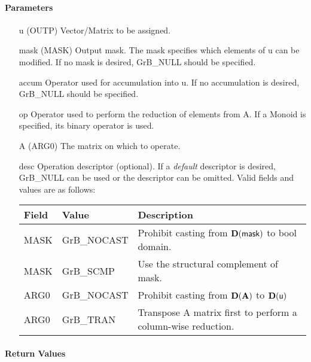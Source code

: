\paragraph{Parameters}

\begin{itemize}[leftmargin=1.1in]
    \item[{\sf u}]   ({\sf OUTP}) Vector/Matrix to be assigned.

    \item[{\sf mask}] ({\sf MASK}) Output mask. The mask specifies which elements
    of {\sf u} can be modified. If no mask is desired, {\sf GrB\_NULL} should be specified.

    \item[{\sf accum}] Operator used for accumulation into {\sf u}.  If no accumulation
                        is desired, {\sf GrB\_NULL} should be specified.

    \item[{\sf op}]    Operator used to perform the reduction of elements from {\sf A}.  If a Monoid is specified, its binary operator is used.
    \item[{\sf A}]     ({\sf ARG0}) The matrix on which to operate.

    \item[{\sf desc}]   Operation descriptor (optional). If a
    \emph{default} descriptor is desired, {\sf GrB\_NULL} can be
    used or the descriptor can be omitted.  Valid fields and values are as follows: \\
    \begin{tabular}{lll}
    Field  & Value & Description \\
    \hline
    {\sf MASK} & {\sf GrB\_NOCAST} & Prohibit casting from $\bold{D}({\sf mask})$ to {\sf bool} domain. \\
    {\sf MASK} & {\sf GrB\_SCMP} & Use the structural complement of {\sf mask}. \\
    {\sf ARG0} & {\sf GrB\_NOCAST} & Prohibit casting from $\bold{D}({\bf A})$ to $\bold{D}({\sf u})$ \\
    {\sf ARG0} & {\sf GrB\_TRAN} & Transpose {\sf A} matrix first to perform a 
    column-wise reduction. \\
    \end{tabular}

\end{itemize}


\paragraph{Return Values}

